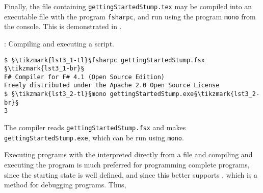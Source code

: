 \documentclass[fsharpNotes.tex]{subfiles}
\begin{document}
Finally, the file containing \lstinline[language=console]{gettingStartedStump.tex} may be compiled into an executable file with the program \lstinline[language=console]{fsharpc}, and run using the program \lstinline[language=console]{mono} from the console. This is demonstrated in .
%
\begin{codeNOutput}[label=compiler,
  top=-5pt,
  bottom=-5pt,
  left=-2pt,
  right=-2pt,
]{: Compiling and executing a script.}
\begin{lstlisting}[language=console,escapechar=§]
$ §\tikzmark{lst3_1-tl}§fsharpc gettingStartedStump.fsx §\tikzmark{lst3_1-br}§
F# Compiler for F# 4.1 (Open Source Edition)
Freely distributed under the Apache 2.0 Open Source License
$ §\tikzmark{lst3_2-tl}§mono gettingStartedStump.exe§\tikzmark{lst3_2-br}§
3
\end{lstlisting}
%
%
\end{codeNOutput}
%
The compiler reads \lstinline[language=console]{gettingStartedStump.fsx} and makes \lstinline[language=console]{gettingStartedStump.exe}, which can be run using \lstinline[language=console]{mono}.



Executing programs with the interpreted directly from a file and compiling and executing the program is much preferred for programming complete programs, since the starting state is well defined, and since this better supports , which is a method for debugging programs. Thus, %
\end{document}
